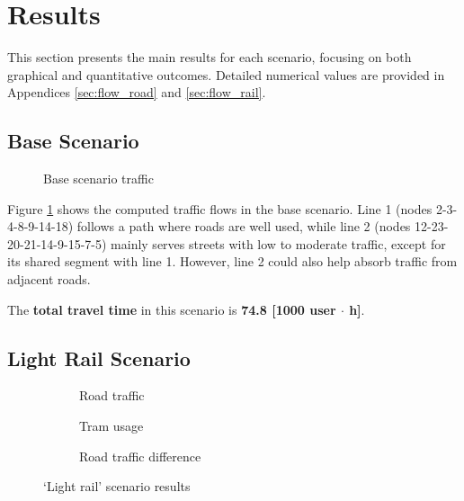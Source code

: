 \section{Results}

This section presents the main results for each scenario, focusing on both graphical and quantitative outcomes. Detailed numerical values are provided in Appendices \ref{sec:flow_road} and \ref{sec:flow_rail}.

\subsection{Base Scenario}

\begin{figure}
    \centering
    \resizebox{0.33\textwidth}{!}{}
    \caption{Base scenario traffic}
    \label{fig:base_scenario}
\end{figure}

Figure \ref{fig:base_scenario} shows the computed traffic flows in the base scenario. Line 1 (nodes 2-3-4-8-9-14-18) follows a path where roads are well used, while line 2 (nodes 12-23-20-21-14-9-15-7-5) mainly serves streets with low to moderate traffic, except for its shared segment with line 1. However, line 2 could also help absorb traffic from adjacent roads.

The \textbf{total travel time} in this scenario is \textbf{74.8 [1000 user $\cdot$ h]}.

\subsection{Light Rail Scenario}

\begin{figure}
    \centering
    \begin{subfigure}{0.33\textwidth}
        \centering
        \resizebox{\textwidth}{!}{}
        \caption{Road traffic}
    \end{subfigure}%
    \begin{subfigure}{0.33\textwidth}
        \centering
        \resizebox{\textwidth}{!}{}
        \caption{Tram usage}
        \label{fig:tram_sc2}
    \end{subfigure}%
    \begin{subfigure}{0.33\textwidth}
        \centering
        \resizebox{\textwidth}{!}{}
        \caption{Road traffic difference}
        \label{fig:diff_sc2}
    \end{subfigure}
    \caption{`Light rail' scenario results}
    \label{fig:lightrail_scenario}
\end{figure}

